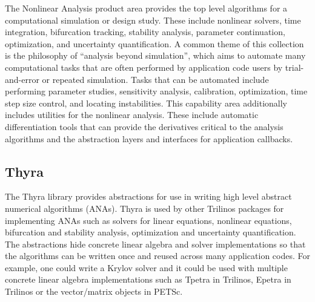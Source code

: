 
The Nonlinear Analysis product area provides the top level algorithms for a computational simulation or design study.
These include nonlinear solvers, time integration, bifurcation tracking, stability analysis, parameter continuation, optimization, and uncertainty quantification.
A common theme of this collection is the philosophy of ``analysis beyond simulation'', which aims to automate many computational tasks that are often performed by application code users by trial-and-error or repeated simulation.
Tasks that can be automated include performing parameter studies, sensitivity analysis, calibration, optimization, time step size control, and locating instabilities.
This capability area additionally includes utilities for the nonlinear analysis. These include automatic differentiation tools that can provide the derivatives critical to the analysis algorithms and the abstraction layers and interfaces for application callbacks.

\subsection{Thyra}
The Thyra library provides abstractions for use in writing high level abstract numerical algorithms (ANAs). Thyra is used by other Trilinos packages for implementing ANAs such as solvers for linear equations, nonlinear equations, bifurcation and stability analysis, optimization and uncertainty quantification. The abstractions hide concrete linear algebra and solver implementations so that the algorithms can be written once and reused across many application codes. For example, one could write a Krylov solver and it could be used with multiple concrete linear algebra implementations such as Tpetra in Trilinos, Epetra in Trilinos or the vector/matrix objects in PETSc.

